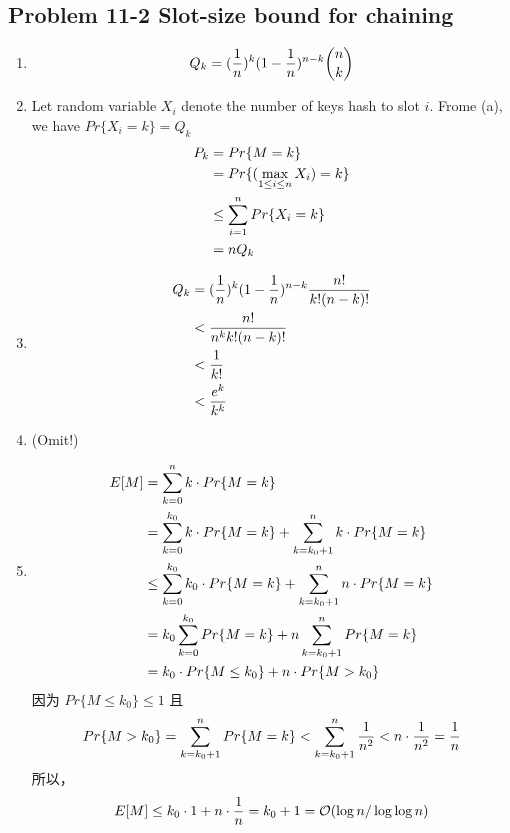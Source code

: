 \subsection*{Problem 11-2 Slot-size bound for chaining}
\begin{enumerate}
	\item	\begin{equation} \notag
			Q_k = (\frac{1}{n})^k (1 - \frac{1}{n})^{n -k} \binom{n}{k}
		\end{equation}
	\item	Let random variable $X_i$ denote the number of keys hash to slot $i$. Frome (a), we have $Pr\{X_i = k\} = Q_k$
		\begin{equation} \notag
		\begin{aligned}
			P_k 	& = Pr\{M = k\} \\
				& = Pr\{(\max_{1 \leq i \leq n} X_i) = k\} \\
				& \leq \sum_{i = 1}^{n} Pr\{X_i = k\} \\
				& = n Q_k
		\end{aligned}
		\end{equation}
	\item	\begin{equation} \notag
		\begin{aligned}
			Q_k	& = (\frac{1}{n})^k (1 - \frac{1} {n})^{n -k} \frac{n!}{k!(n - k)!} \\
				& < \frac{n!}{n^k k! (n - k)!} \\
				& < \frac{1}{k!} \\
				& < \frac{e^k}{k^k}
		\end{aligned}
		\end{equation}
	\item	(Omit!)
	\item	\begin{equation} \notag
		\begin{aligned}
			E[M]	& = \sum_{k = 0}^{n} k \cdot Pr\{M = k\} \\
				& = \sum_{k = 0}^{k_0} k \cdot Pr\{M = k\} + \sum_{k = k_0 + 1}^{n} k \cdot Pr\{M = k\} \\
				& \leq \sum_{k = 0}^{k_0} k_0 \cdot Pr\{M = k\} + \sum_{k = k_0 + 1}^{n} n \cdot Pr\{M = k\} \\
				& = k_0 \sum_{k = 0}^{k_0} Pr\{M = k\} + n \sum_{k = k_0 + 1}^{n} Pr\{M = k\} \\
				& = k_0 \cdot Pr\{M \leq k_0\} + n \cdot Pr\{M > k_0\}
		\end{aligned}
		\end{equation}
		因为 $Pr\{M \leq k_0\} \leq 1$ 且
		\begin{equation} \notag
			Pr\{M > k_0\} = \sum_{k = k_0 + 1}^{n} Pr\{M = k\} < \sum_{k = k_0 + 1}^{n} \frac{1}{n^2} < n \cdot \frac{1}{n^2} = \frac{1}{n}
		\end{equation}
		所以，
		\begin{equation} \notag
			E[M] \leq k_0 \cdot 1 + n \cdot \frac{1}{n} = k_0 + 1 = \mathcal{O}(\log{n} / \log{\log{n}})
		\end{equation}
\end{enumerate}

